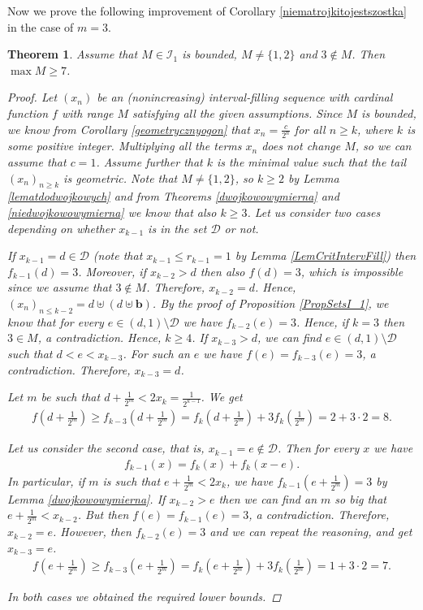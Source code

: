 \documentclass{amsart}
\newtheorem{theorem}{Theorem}[section]
\theoremstyle{definition}
\begin{document}
Now we prove the following improvement of Corollary \ref{niematrojkitojestszostka} in the case of $m=3$.

\begin{theorem}\label{conajmniejsiedem}
Assume that $M\in \mathcal{I}_1$ is bounded, $M\neq \{1,2\}$ and $3\notin M$. Then $\max M\geq 7$.
\begin{proof}
Let $(x_n)$ be an (nonincreasing) interval-filling sequence with cardinal function $f$ with range $M$ satisfying all the given assumptions. 
Since $M$ is bounded, we know from Corollary \ref{geometrycznyogon} that $x_n=\frac{c}{2^n}$ for all $n\geq k$, where $k$ is some positive integer. Multiplying all the terms $x_{n}$ does not change $M$, so we can assume that $c=1$. Assume further that $k$ is the minimal value such that the tail $(x_n)_{n\geq k}$ is geometric.  Note that $M\neq\{1,2\}$, so $k\geq 2$ by Lemma \ref{lematdodwojkowych} and from Theorems \ref{dwojkowowymierna} and \ref{niedwojkowowymierna} we know that also $k\geq 3$. Let us consider two cases depending on whether $x_{k-1}$ is in the set $\mathcal{D}$ or not. 


If $x_{k-1}=d\in \mathcal{D}$ (note that $x_{k-1}\leq r_{k-1}=1$ by Lemma \ref{LemCritIntervFill}) then $f_{k-1}(d)=3$. Moreover, if $x_{k-2}>d$ then also $f(d)=3$, which is impossible since we assume that $3\notin M$. Therefore, $x_{k-2}=d$. Hence, $(x_{n})_{n\leq k-2} = d\uplus (d\uplus \mathbf{b})$. By the proof of Proposition \ref{PropSetsI_1}, we know that for every $e\in (d,1)\setminus\mathcal{D}$ we have $f_{k-2}(e)=3$. Hence, if $k=3$ then $3\in M$, a contradiction. Hence, $k\geq 4$. If $x_{k-3}>d$, we can find $e\in (d,1)\setminus \mathcal{D}$ such that $d<e<x_{k-3}$. For such an $e$ we have $f (e)= f_{k-3}(e)=3$, a contradiction. Therefore, $x_{k-3}=d$. 

Let $m$ be such that $d+\frac{1}{2^{m}} < 2x_{k} = \frac{1}{2^{k-1}}$. We get
\begin{align*}
f\left(d+\frac{1}{2^m}\right)\geq f_{k-3}\left(d+\frac{1}{2^m}\right)=f_{k}\left(d+\frac{1}{2^m}\right)+3f_{k}\left(\frac{1}{2^m}\right)=2+3\cdot 2 = 8.
\end{align*}


Let us consider the second case, that is, $x_{k-1}=e\notin \mathcal{D}$. Then for every $x$ we have
\begin{align*}
f_{k-1}(x) = f_{k}(x) + f_{k}(x-e).
\end{align*}
In particular, if $m$ is such that $e+\frac{1}{2^{m}} < 2x_{k}$, we have $f_{k-1}\left(e + \frac{1}{2^{m}}\right) = 3$ by Lemma \ref{dwojkowowymierna}. If $x_{k-2}>e$ then we can find an $m$ so big that $e+\frac{1}{2^{m}} < x_{k-2}$. But then $f(e)=f_{k-1}(e)=3$, a contradiction. Therefore, $x_{k-2}=e$. However, then $f_{k-2}(e)=3$ and we can repeat the reasoning, and get $x_{k-3}=e$. 
\begin{align*}
f\left(e+\frac{1}{2^m}\right)\geq f_{k-3}\left(e+\frac{1}{2^m}\right)=f_{k}\left(e+\frac{1}{2^m}\right)+3f_{k}\left(\frac{1}{2^m}\right)=1+3\cdot 2 = 7.
\end{align*}

In both cases we obtained the required lower bounds.
\end{proof}
\end{theorem}
\end{document}
